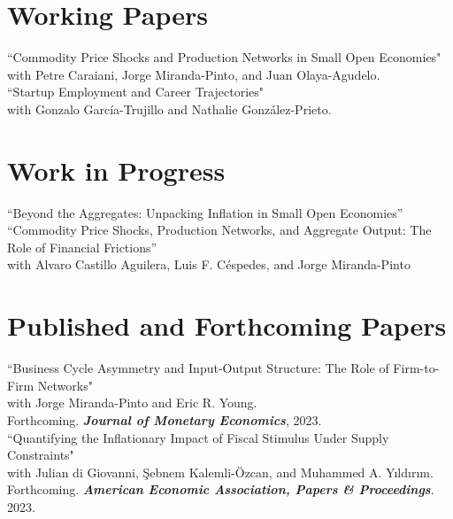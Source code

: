 \documentclass[11pt]{article}
\begin{document}
\section*{Working Papers}

``Commodity Price Shocks and Production Networks in Small Open Economies"\\
 with Petre Caraiani, Jorge Miranda-Pinto, and Juan Olaya-Agudelo.\\[-0.1in]

 ``Startup Employment and Career Trajectories"\\
 with Gonzalo Garc\'ia-Trujillo and Nathalie Gonz\'alez-Prieto.

\section*{Work in Progress}

``Beyond the Aggregates: Unpacking Inflation in Small Open Economies''\\[-0.1in]

``Commodity Price Shocks, Production Networks, and Aggregate Output: The Role of Financial Frictions''\\
with Alvaro Castillo Aguilera, Luis F. C\'espedes, and Jorge Miranda-Pinto\\[-0.1in]









\section*{Published and Forthcoming Papers}

``Business Cycle Asymmetry and Input-Output Structure: The Role of Firm-to-Firm Networks"\\
 with Jorge Miranda-Pinto and Eric R. Young.\\
Forthcoming. \textbf{\textit{Journal of Monetary Economics}}, 2023.\\[-0.1in]


``Quantifying the Inflationary Impact of Fiscal Stimulus Under Supply Constraints"\\
with Julian di Giovanni, \c{S}ebnem Kalemli-\"{O}zcan, and Muhammed A. Y{\i}ld{\i}r{\i}m. \\
Forthcoming. \textbf{\textit{American Economic Association, Papers \& Proceedings}}. 2023.\\[-0.1in]
\end{document}
